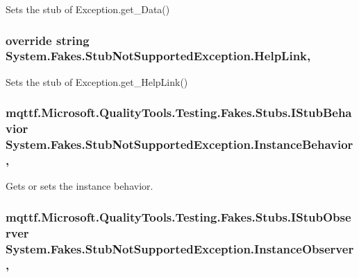 Sets the stub of Exception.\-get\-\_\-\-Data()

\hypertarget{class_system_1_1_fakes_1_1_stub_not_supported_exception_abd2f586fbc7a33cb644460f575eb10d7}{
\subsubsection[{Help\-Link}]{\setlength{\rightskip}{0pt plus 5cm}override string System.\-Fakes.\-Stub\-Not\-Supported\-Exception.\-Help\-Link\hspace{0.3cm}{\ttfamily [get]}, {\ttfamily [set]}}}\label{class_system_1_1_fakes_1_1_stub_not_supported_exception_abd2f586fbc7a33cb644460f575eb10d7}


Sets the stub of Exception.\-get\-\_\-\-Help\-Link()

\hypertarget{class_system_1_1_fakes_1_1_stub_not_supported_exception_a18248a7b7b508191584c205401b90eb5}{
\subsubsection[{Instance\-Behavior}]{\setlength{\rightskip}{0pt plus 5cm}mqttf.\-Microsoft.\-Quality\-Tools.\-Testing.\-Fakes.\-Stubs.\-I\-Stub\-Behavior System.\-Fakes.\-Stub\-Not\-Supported\-Exception.\-Instance\-Behavior\hspace{0.3cm}{\ttfamily [get]}, {\ttfamily [set]}}}\label{class_system_1_1_fakes_1_1_stub_not_supported_exception_a18248a7b7b508191584c205401b90eb5}


Gets or sets the instance behavior.

\hypertarget{class_system_1_1_fakes_1_1_stub_not_supported_exception_a7ce4fa55bdd912f3e57d0281a866a144}{
\subsubsection[{Instance\-Observer}]{\setlength{\rightskip}{0pt plus 5cm}mqttf.\-Microsoft.\-Quality\-Tools.\-Testing.\-Fakes.\-Stubs.\-I\-Stub\-Observer System.\-Fakes.\-Stub\-Not\-Supported\-Exception.\-Instance\-Observer\hspace{0.3cm}{\ttfamily [get]}, {\ttfamily [set]}}}\label{class_system_1_1_fakes_1_1_stub_not_supported_exception_a7ce4fa55bdd912f3e57d0281a866a144}


